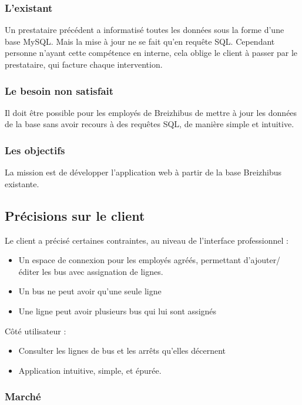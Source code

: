 \documentclass[french]{article}
\begin{document}
\subsubsection{L'existant}

Un prestataire précédent a informatisé toutes les données sous la forme d'une base MySQL. Mais la mise à jour ne se fait qu'en requête SQL. Cependant personne n'ayant cette compétence en interne, cela oblige le client à passer par le prestataire, qui facture chaque intervention.

\subsubsection{Le besoin non satisfait}

Il doit être possible pour les employés de Breizhibus de mettre à jour les données de la base sans avoir recours à des requêtes SQL, de manière simple et intuitive.

\subsubsection{Les objectifs}

La mission est de développer l'application web à partir de la base Breizhibus existante.

\subsection{Précisions sur le client}

Le client a précisé certaines contraintes, au niveau de l'interface professionnel : 
\begin{itemize}
    \item Un espace de connexion pour les employés agréés, permettant d'ajouter/éditer les bus avec assignation de lignes.
    \item Un bus ne peut avoir qu'une seule ligne
    \item Une ligne peut avoir plusieurs bus qui lui sont assignés
\end{itemize}

Côté utilisateur :
\begin{itemize}
    \item Consulter les lignes de bus et les arrêts qu'elles décernent
    \item Application intuitive, simple, et épurée.
\end{itemize}

\subsubsection{Marché}
\end{document}
